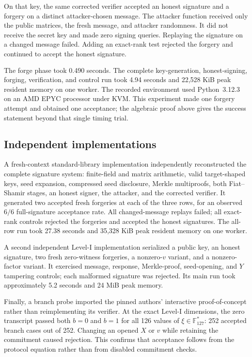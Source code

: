 \documentclass[10pt,a4paper]{article}
\newcommand{\F}{\mathbb{F}}
\begin{document}
On that key, the same corrected verifier accepted an honest signature and a
forgery on a distinct attacker-chosen message.  The attacker function received
only the public matrices, the fresh message, and attacker randomness.  It did
not receive the secret key and made zero signing queries.  Replaying the
signature on a changed message failed.  Adding an exact-rank test rejected the
forgery and continued to accept the honest signature.

The forge phase took 0.490 seconds.  The complete key-generation,
honest-signing, forging, verification, and control run took 4.94 seconds and
22,528 KiB peak resident memory on one worker.  The recorded environment used
Python~3.12.3 on an AMD EPYC processor under KVM.  This experiment made one
forgery attempt and obtained one acceptance; the algebraic proof above gives
the success statement beyond that single timing trial.

\subsection{Independent implementations}

A fresh-context standard-library implementation independently reconstructed
the complete signature system: finite-field and matrix arithmetic, valid
target-shaped keys, seed expansion, compressed seed disclosure, Merkle
multiproofs, both Fiat--Shamir stages, an honest signer, the attacker, and the
corrected verifier.  It generated two accepted fresh forgeries at each of the
three rows, for an observed $6/6$ full-signature acceptance rate.  All
changed-message replays failed; all exact-rank controls rejected the
forgeries and accepted the honest signatures.  The all-row run took 27.38
seconds and 35,328 KiB peak resident memory on one worker.

A second independent Level-I implementation serialized a public key, an
honest signature, two fresh zero-witness forgeries, a nonzero-$v$ variant, and
a nonzero-factor variant.  It exercised message, response, Merkle-proof,
seed-opening, and $Y$ tampering controls; each malformed signature was
rejected.  Its main run took approximately 5.2 seconds and 24 MiB peak memory.

Finally, a branch probe imported the pinned authors' interactive
proof-of-concept rather than reimplementing its verifier.  At the exact
Level-I dimensions, the zero transcript passed both $b=0$ and $b=1$ for all
126 values of $\xi\in\F_{127}^*$: 252 accepted branch cases out of 252.
Changing an opened $X$ or $v$ while retaining the commitment caused rejection.
This confirms that acceptance follows from the protocol equation rather than
from disabled commitment checks.
\end{document}

